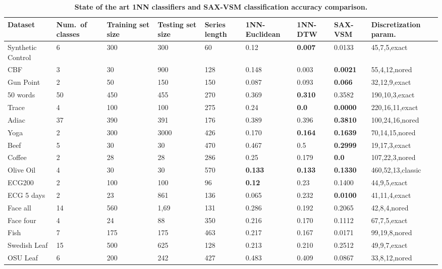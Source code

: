 \begin{table}[t!]
\caption{\bf State of the art 1NN classifiers and SAX-VSM classification accuracy comparison.}
 \label{perf_table2}
\centering
{\setlength{\extrarowheight}{1pt}%
{\scriptsize
\begin{tabularx}{\linewidth}{@{} l *7X @{} l}
\hline
Dataset & \mbox{Num. of} classes & Training set size & Testing set size & Series length & 1NN-Euclidean & 1NN-DTW & SAX-VSM & Discretization param. \\
\hline
Synthetic Control & 6 & 300 & 300 & 60 & 0.12 & \textbf{0.007} & 0.0133 & 45,7,5,exact \\
CBF & 3 & 30 & 900 & 128 & 0.148 & 0.003 & \textbf{0.0021} & 55,4,12,nored \\
Gun Point & 2 & 50 & 150 & 150 & 0.087 & 0.093 & \textbf{0.066} & 32,12,9,exact \\
50 words & 50 & 450 & 455 & 270 & 0.369 & \textbf{0.310} & 0.3582 & 190,10,3,exact \\ 
Trace & 4 & 100 & 100 & 275 & 0.24 & \textbf{0.0} & \textbf{0.0000} & 220,16,11,exact \\
Adiac & 37 & 390 & 391 & 176 & 0.389 & 0.396 & \textbf{0.3810} & 100,24,16,nored \\
Yoga & 2 & 300 & 3000 & 426 & 0.170 & \textbf{0.164} & \textbf{0.1639} & 70,14,15,nored \\ 
Beef & 5 & 30 & 30 & 470 & 0.467 & 0.5 & \textbf{0.2999} & 19,17,3,exact \\ 
Coffee & 2 & 28 & 28 & 286 & 0.25 & 0.179 & \textbf{0.0} & 107,22,3,nored \\
Olive Oil & 4 & 30 & 30 & 570 & \textbf{0.133} & \textbf{0.133} & \textbf{0.1330} & 460,52,13,classic \\
ECG200 & 2 & 100 & 100 & 96 & \textbf{0.12} & 0.23 & 0.1400 & 44,9,5,exact \\
ECG 5 days & 2 & 23 & 861 & 136 & 0.065 & 0.232 & \textbf{0.0100} & 41,11,4,exact \\
Face all & 14 & 560 & 1,69 & 131 & 0.286 & 0.192 & 0.2065 & 42,8,4,nored \\
Face four & 4 & 24 & 88 & 350 & 0.216 & 0.170 & 0.1112 & 67,7,5,exact \\
Fish & 7 & 175 & 175 & 463 & 0.217 & 0.167 & 0.0171 & 99,19,8,nored \\
Swedish Leaf & 15 & 500 & 625 & 128 & 0.213 & 0.210 & 0.2512 & 49,9,7,exact \\
OSU Leaf & 6 & 200 & 242 & 427 & 0.483 & 0.409 & 0.0867 & 33,8,12,nored \\

\end{tabularx}}}
\end{table}
